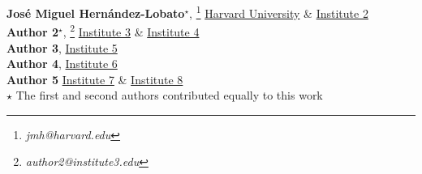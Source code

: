 \textbf{Jos\'e Miguel Hern\'andez-Lobato}$^\star$, \footnote{\textit{jmh@harvard.edu}} \href{https://www.jmhl.org}{Harvard University} \& \href{https://www.authorea.com/inst/}{Institute 2}\\ \textbf{Author 2}$^\star$, \footnote{\textit{author2@institute3.edu}} \href{https://www.authorea.com/inst/}{Institute 3} \& \href{https://www.authorea.com/inst/}{Institute 4} \\ \textbf{Author 3}, \href{https://www.authorea.com/inst/}{Institute 5}\\ \textbf{Author 4}, \href{https://www.authorea.com/inst/}{Institute 6} \\ \textbf{Author 5} \href{https://www.authorea.com/inst/}{Institute 7} \& \href{https://www.authorea.com/inst/}{Institute 8}\\ $\star$ The first and second authors contributed equally to this work 